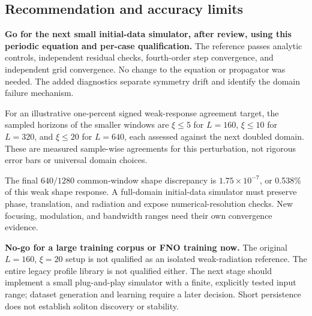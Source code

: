 \subsection{Recommendation and accuracy limits}

\textbf{Go for the next small initial-data simulator, after review, using this periodic equation and per-case qualification.} The reference passes analytic controls, independent residual checks, fourth-order step convergence, and independent grid convergence. No change to the equation or propagator was needed. The added diagnostics separate symmetry drift and identify the domain failure mechanism.

For an illustrative one-percent signed weak-response agreement target, the sampled horizons of the smaller windows are $\xi\leq 5$ for $L=160$, $\xi\leq 10$ for $L=320$, and $\xi\leq 20$ for $L=640$, each assessed against the next doubled domain. These are measured sample-wise agreements for this perturbation, not rigorous error bars or universal domain choices.

The final $640/1280$ common-window shape discrepancy is $1.75\times10^{-7}$, or 0.538\% of this weak shape response. A full-domain initial-data simulator must preserve phase, translation, and radiation and expose numerical-resolution checks. New focusing, modulation, and bandwidth ranges need their own convergence evidence.

\textbf{No-go for a large training corpus or FNO training now.} The original $L=160$, $\xi=20$ setup is not qualified as an isolated weak-radiation reference. The entire legacy profile library is not qualified either. The next stage should implement a small plug-and-play simulator with a finite, explicitly tested input range; dataset generation and learning require a later decision. Short persistence does not establish soliton discovery or stability.
